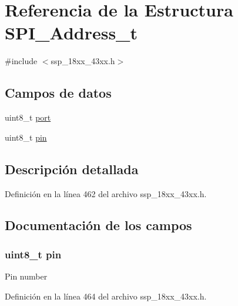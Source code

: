 \hypertarget{struct_s_p_i___address__t}{}\section{Referencia de la Estructura S\+P\+I\+\_\+\+Address\+\_\+t}
\label{struct_s_p_i___address__t}


{\ttfamily \#include $<$ssp\+\_\+18xx\+\_\+43xx.\+h$>$}

\subsection*{Campos de datos}
\begin{DoxyCompactItemize}
\item 
uint8\+\_\+t \hyperlink{struct_s_p_i___address__t_a2fa54f9024782843172506fadbee2ac8}{port}
\item 
uint8\+\_\+t \hyperlink{struct_s_p_i___address__t_ab40a673fb19c1e650e1f79de91788aa5}{pin}
\end{DoxyCompactItemize}


\subsection{Descripción detallada}


Definición en la línea 462 del archivo ssp\+\_\+18xx\+\_\+43xx.\+h.



\subsection{Documentación de los campos}
\subsubsection[{\texorpdfstring{pin}{pin}}]{\setlength{\rightskip}{0pt plus 5cm}uint8\+\_\+t pin}\hypertarget{struct_s_p_i___address__t_ab40a673fb19c1e650e1f79de91788aa5}{}\label{struct_s_p_i___address__t_ab40a673fb19c1e650e1f79de91788aa5}
Pin number 

Definición en la línea 464 del archivo ssp\+\_\+18xx\+\_\+43xx.\+h.

